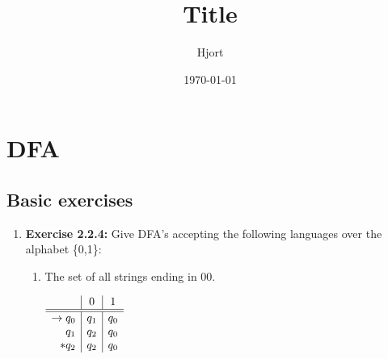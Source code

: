 \documentclass{article}
\title{Title}
\date{\today}
\author{Hjort}
\begin{document}
\maketitle

\section*{DFA}
\subsection*{Basic exercises}

\begin{enumerate}
    \item \textbf{Exercise 2.2.4:} Give DFA's accepting the following languages over the alphabet \{0,1\}:

        \begin{enumerate}
            \item The set of all strings ending in $00$.

                $
                \begin{array}{r | c | c}
                     & 0 & 1 \\ \hline \hline
                    \to q_0 & q_1 & q_0 \\
                    q_1 & q_2 & q_0\\
                    *q_2 & q_2 & q_0
                \end{array}
                $
        \end{enumerate}
\end{enumerate}




\end{document}

